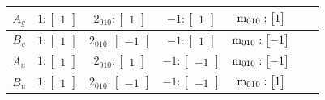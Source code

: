 \documentclass[fleqn,8pt,landscape]{jsarticle}
\begin{document}
\begin{longtable}{ccccccc}
$ A_{g} $ & $ 1:\begin{bmatrix} 1 \end{bmatrix} $ & $ 2{}_{010}:\begin{bmatrix} 1 \end{bmatrix} $ & $ -1:\begin{bmatrix} 1 \end{bmatrix} $ & $ {\rm m}_{010}:\begin{bmatrix} 1 \end{bmatrix} $ \\ \hline
$ B_{g} $ & $ 1:\begin{bmatrix} 1 \end{bmatrix} $ & $ 2{}_{010}:\begin{bmatrix} -1 \end{bmatrix} $ & $ -1:\begin{bmatrix} 1 \end{bmatrix} $ & $ {\rm m}_{010}:\begin{bmatrix} -1 \end{bmatrix} $ \\ \hline
$ A_{u} $ & $ 1:\begin{bmatrix} 1 \end{bmatrix} $ & $ 2{}_{010}:\begin{bmatrix} 1 \end{bmatrix} $ & $ -1:\begin{bmatrix} -1 \end{bmatrix} $ & $ {\rm m}_{010}:\begin{bmatrix} -1 \end{bmatrix} $ \\ \hline
$ B_{u} $ & $ 1:\begin{bmatrix} 1 \end{bmatrix} $ & $ 2{}_{010}:\begin{bmatrix} -1 \end{bmatrix} $ & $ -1:\begin{bmatrix} -1 \end{bmatrix} $ & $ {\rm m}_{010}:\begin{bmatrix} 1 \end{bmatrix} $ \\
\end{longtable}
\end{document}
